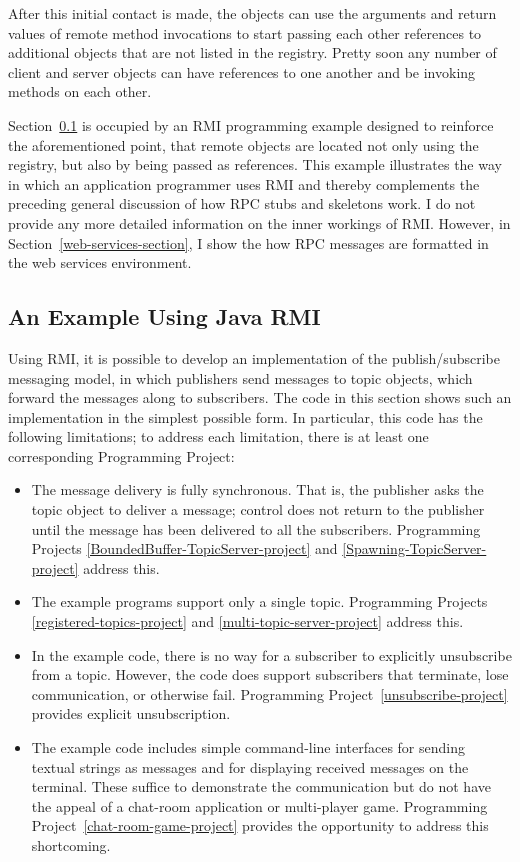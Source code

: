 After this initial contact is made, the objects can use the arguments
and return values of remote method invocations to start passing each
other references to additional objects that are not listed in the
registry.  Pretty soon any number of client and server objects can
have references to one another and be invoking methods on each other.

Section~\ref{RMI-example-section} is occupied by an RMI programming
example designed to reinforce the aforementioned point, that remote
objects are located not only using the registry, but also by being
passed as references. This example illustrates the way in which an
application programmer uses RMI and thereby complements the preceding
general discussion of how RPC stubs and skeletons work.  I do not
provide any more detailed information on the inner workings of RMI.
However, in Section~\ref{web-services-section}, I show the how RPC
messages are formatted in the web services environment.

\subsection{An Example Using Java RMI}\label{RMI-example-section}

Using RMI, it is possible to develop an implementation of the
publish/subscribe messaging model, in which publishers send messages
to topic objects, which forward the messages along to subscribers.
The code in this section shows such an implementation in the simplest
possible form.  In particular, this code has the following limitations;
to address each limitation, there is at least one corresponding Programming Project:
\begin{itemize}
\item
The message delivery is fully synchronous.  That is, the publisher asks
the topic object to deliver a message; control does not return to the
publisher until the message has been delivered to all the subscribers.
Programming Projects \ref{BoundedBuffer-TopicServer-project} and
\ref{Spawning-TopicServer-project} address this.
\item
The example programs support only a single topic.  Programming
Projects \ref{registered-topics-project} and
\ref{multi-topic-server-project} address this.
\item
In the example code, there is no way for a subscriber to explicitly
unsubscribe from a topic.  However, the code does support subscribers
that terminate, lose communication, or otherwise fail.  Programming
Project~\ref{unsubscribe-project} provides explicit unsubscription.
\item
The example code includes simple command-line interfaces for sending
textual strings as messages and for displaying received messages on
the terminal.  These suffice to demonstrate the communication but do
not have the appeal of a chat-room application or multi-player game.
Programming Project~\ref{chat-room-game-project} provides the opportunity
to address this shortcoming.
\end{itemize}


